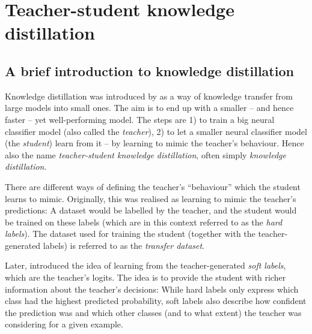 \documentclass[bsc,frontabs,singlespacing,parskip,deptreport]{infthesis}
\begin{document}
{  \section{Teacher-student knowledge distillation}{
    \label{sec:KD}
    \subsection{A brief introduction to knowledge distillation}{
      \label{sec:KD-intro}
      Knowledge distillation was introduced by \citep{Bucila_2006} as a way of knowledge transfer from large models into small ones. The aim is to end up with a smaller -- and hence faster -- yet well-performing model. The steps are 1) to train a big neural classifier model (also called the \textit{teacher}), 2) to let a smaller neural classifier model (the \textit{student}) learn from it -- by learning to mimic the teacher's behaviour. Hence also the name \textit{teacher-student knowledge distillation}, often simply \textit{knowledge distillation}.
      
      There are different ways of defining the teacher's ``behaviour'' which the student learns to mimic. Originally, this was realised as learning to mimic the teacher's predictions: A dataset would be labelled by the teacher, and the student would be trained on these labels (which are in this context referred to as the \textit{hard labels}). The dataset used for training the student (together with the teacher-generated labels) is referred to as the \textit{transfer dataset}.

      Later, \citet{Ba_2013} introduced the idea of learning from the teacher-generated \textit{soft labels}, which are the teacher's logits. The idea is to provide the student with richer information about the teacher's decisions: While hard labels only express which class had the highest predicted probability, soft labels also describe how confident the prediction was and which other classes (and to what extent) the teacher was considering for a given example.

}}}
\end{document}
